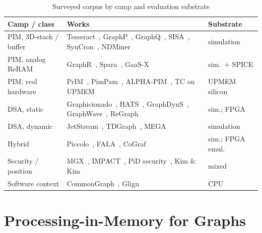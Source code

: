 \documentclass[journal,onecolumn]{IEEEtran}
\begin{document}
\begin{table}[t]
\caption{Surveyed corpus by camp and evaluation substrate}
\label{tab:corpus}
\centering\footnotesize
\begin{tabularx}{\columnwidth}{@{}L{3.3cm}YL{2.4cm}@{}}
\toprule
Camp / class & Works & Substrate \\
\midrule
PIM, 3D-stack / buffer & Tesseract~\cite{ahn2015tesseract}, GraphP~\cite{zhang2018graphp}, GraphQ~\cite{zhuo2019graphq}, SISA~\cite{besta2021sisa}, SynCron~\cite{giannoula2021syncron}, NDMiner~\cite{talati2022ndminer} & simulation \\
PIM, analog ReRAM & GraphR~\cite{song2018graphr}, Spara~\cite{zheng2020spara}, GaaS-X~\cite{challapalle2020gaasx} & sim.\ + SPICE \\
PIM, real hardware & PrIM~\cite{gomezluna2022prim}, PimPam~\cite{cai2024pimpam}, ALPHA-PIM~\cite{barkhordar2025alphapim}, TC on UPMEM~\cite{asquini2025tc} & UPMEM silicon \\
DSA, static & Graphicionado~\cite{ham2016graphicionado}, HATS~\cite{mukkara2018hats}, GraphDynS~\cite{yan2019graphdyns}, GraphWave~\cite{lee2022graphwave}, ReGraph~\cite{chen2022regraph} & sim.; FPGA \\
DSA, dynamic & JetStream~\cite{rahman2021jetstream}, TDGraph~\cite{zhao2022tdgraph}, MEGA~\cite{gao2023mega} & simulation \\
Hybrid & Piccolo~\cite{shin2025piccolo}, FALA~\cite{shin2025fala}, CoGraf~\cite{yenimol2026cograf} & sim.; FPGA emul. \\
Security / position & MGX~\cite{hua2022mgx}, IMPACT~\cite{bostanci2025impact}, PiD security~\cite{yuksel2026pid}, Kim \& Kim~\cite{kim2020dynamic} & mixed \\
Software context & CommonGraph~\cite{afarin2023commongraph}, Glign~\cite{yin2023glign} & CPU \\
\bottomrule
\end{tabularx}
\end{table}

\section{Processing-in-Memory for Graphs}\label{sec:pim}
\end{document}
